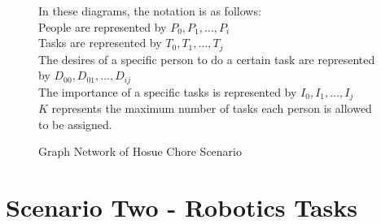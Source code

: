 \documentclass{article}
\newcommand\tab[1][1cm]{\hspace*{#1}}
\begin{document}
\begin{figure}[ht!]
  \caption{Graph Network of Hosue Chore Scenario}
In these diagrams, the notation is as follows: \\
\tab People are represented by $P_0, P_1, ..., P_i$ \\
\tab Tasks are represented by $T_0, T_1, ..., T_j$ \\
\tab The desires of a specific person to do a certain task are represented by $D_{00}, D_{01}, ..., D_{ij}$ \\
\tab The importance of a specific tasks is represented by $I_0, I_1, ..., I_j$ \\
\tab $K$ represents the maximum number of tasks each person is allowed to be assigned.
\end{figure}

\section*{Scenario Two - Robotics Tasks}
\end{document}

